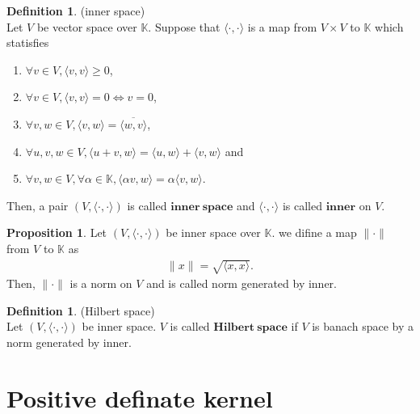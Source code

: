 \documentclass[11pt, a4paper, english, dvipdfmx]{jsarticle}
\theoremstyle{definition}
\newtheorem{Definition+}[Axiom+]{Definition}
\newtheorem{Proposition+}[Axiom+]{Proposition}
\def\hoge<#1>{\langle #1 \rangle}
\newcommand{\K}{\mathbb{K}}
\begin{document}
\begin{Definition+}(inner space)\\
    Let $V$ be vector space over $\K$. Suppose that $\hoge<\cdot, \cdot>$ is a map from $V\times V$ to $\K$
    which statisfies
    \begin{enumerate}
        \item $\forall v\in V, \hoge<v, v>\geq 0$,
        \item $\forall v\in V, \hoge<v, v> = 0\iff v = 0$,
        \item $\forall v, w\in V, \hoge<v, w> = \overline{\hoge<w, v>}$,
        \item $\forall u, v, w\in V, \hoge<u + v, w> = \hoge<u, w> + \hoge<v, w>$ and
        \item $\forall v, w\in V, \forall\alpha\in\K, \hoge<\alpha v, w> = \alpha\hoge<v, w>$.
    \end{enumerate}
    Then, a pair $(V, \hoge<\cdot, \cdot>)$ is called $\mathbf{inner~space}$ and $\hoge<\cdot, \cdot>$ is called $\mathbf{inner}$ on $V$.
\end{Definition+}

\begin{Proposition+}
    Let $(V, \hoge<\cdot, \cdot>)$ be inner space over $\K$.
    we difine a map $\|\cdot\|$ from $V$ to $\K$ as
    \begin{align*}
        \|x\| = \sqrt{\hoge<x, x>}.
    \end{align*}
    Then, $\|\cdot\|$ is a norm on $V$ and is called norm generated by inner. 
\end{Proposition+}
\begin{Definition+}(Hilbert space)\\
    Let $(V, \hoge<\cdot, \cdot>)$ be inner space.
    $V$ is called $\mathbf{Hilbert~space}$ if $V$ is banach space by a norm generated by inner.
\end{Definition+}

\section{Positive definate kernel}
\end{document}
